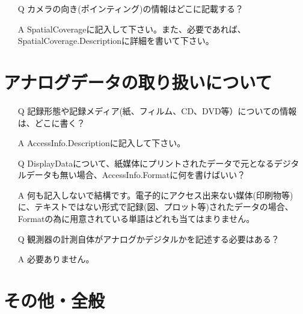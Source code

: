 \begin{screen}
\begin{itemize}
\item[\stepcounter{qq}Q\theqq] カメラの向き(ポインティング)の情報はどこに記載する？
\item[\stepcounter{aa}A\theaa] SpatialCoverageに記入して下さい。また、必要であれば、SpatialCoverage.Descriptionに詳細を書いて下さい。
\end{itemize}
\end{screen}

\section{アナログデータの取り扱いについて}

\begin{screen}
\begin{itemize}
\item[\stepcounter{qq}Q\theqq] 記録形態や記録メディア(紙、フィルム、CD、DVD等）についての情報は、どこに書く？
\item[\stepcounter{aa}A\theaa] AccessInfo.Descriptionに記入して下さい。
\end{itemize}
\end{screen}

\begin{screen}
\begin{itemize}
\item[\stepcounter{qq}Q\theqq] DisplayDataについて、紙媒体にプリントされたデータで元となるデジタルデータも無い場合、AccessInfo.Formatに何を書けばいい？
\item[\stepcounter{aa}A\theaa] 何も記入しないで結構です。電子的にアクセス出来ない媒体(印刷物等)に、テキストではない形式で記録(図、プロット等)されたデータの場合、Formatの為に用意されている単語はどれも当てはまりません。
\end{itemize}
\end{screen}

\begin{screen}
\begin{itemize}
\item[\stepcounter{qq}Q\theqq] 観測器の計測自体がアナログかデジタルかを記述する必要はある？
\item[\stepcounter{aa}A\theaa] 必要ありません。
\end{itemize}
\end{screen}

\section{その他・全般}

